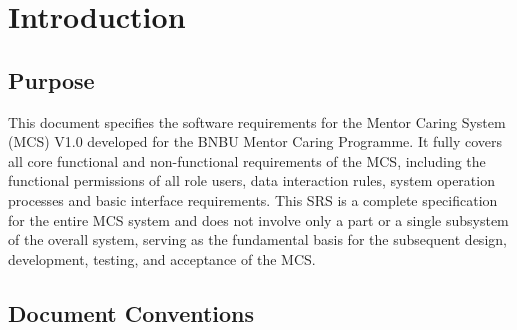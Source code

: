 \documentclass[a4paper,12pt]{article}
\begin{document}
\clearpage
\setcounter{page}{1}
\renewcommand{\thepage}{\arabic{page}}

\section{Introduction}

\subsection{Purpose}

This document specifies the software requirements for the Mentor Caring System (MCS) V1.0 developed for the BNBU Mentor Caring Programme. It fully covers all core functional and non-functional requirements of the MCS, including the functional permissions of all role users, data interaction rules, system operation processes and basic interface requirements. This SRS is a complete specification for the entire MCS system and does not involve only a part or a single subsystem of the overall system, serving as the fundamental basis for the subsequent design, development, testing, and acceptance of the MCS.

\subsection{Document Conventions}
\end{document}
